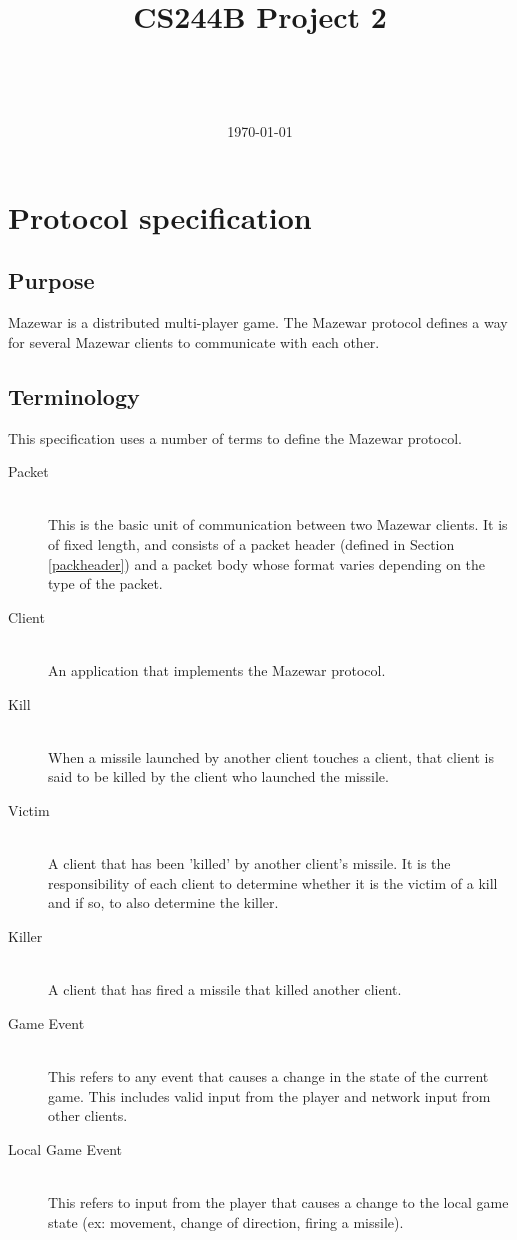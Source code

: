 \documentclass[11pt]{article} %
\author{\myname \\
		\texttt{\myemail}
		\and
		\partnername \\
		\texttt{\partneremail}
}
\begin{document}
\title{CS244B Project 2}
\date{\today}
\maketitle

\tableofcontents

\section{Protocol specification}

\subsection{Purpose}
Mazewar is a distributed multi-player game. The Mazewar protocol defines a way
for several Mazewar clients to communicate with each other.

\subsection{Terminology}
This specification uses a number of terms to define the Mazewar protocol.

\begin{description}
	\item[Packet] \hfill \\
		This is the basic unit of communication between two Mazewar clients. It
		is of fixed length, and consists of a packet header (defined in 
		Section \ref{packheader}) and a packet body whose format varies
		depending on the type of the packet.
	\item[Client] \hfill \\
		An application that implements the Mazewar protocol.
	\item[Kill] \hfill \\
		When a missile launched by another client touches a client, that
		client is said to be killed by the client who launched the missile.
	\item[Victim] \hfill \\
		A client that has been 'killed' by another client's missile. It is the
		responsibility of each client to determine whether it is the victim of a
		kill and if so, to also determine the killer.
	\item[Killer] \hfill \\
		A client that has fired a missile that killed another client.
	\item[Game Event] \hfill \\
		This refers to any event that causes a change in the state of the
		current game. This includes valid input from the player and network
		input from other clients.
	\item[Local Game Event] \hfill \\
		This refers to input from the player that causes a change to the local
		game state (ex: movement, change of direction, firing a missile).
\end{description}
\end{document}
